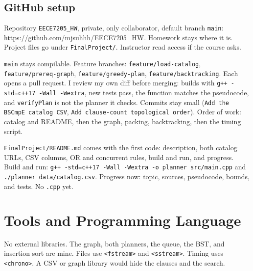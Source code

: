 \documentclass[10pt]{article}
\begin{document}
\subsection{GitHub setup}

Repository \texttt{EECE7205\_HW}, private, only collaborator, default branch
\texttt{main}: \url{https://github.com/mjsuhhh/EECE7205_HW}.
Homework stays where it is. Project files go under \texttt{FinalProject/}.
Instructor read access if the course asks.

\texttt{main} stays compilable. Feature branches:
\texttt{feature/load-catalog}, \texttt{feature/prereq-graph},
\texttt{feature/greedy-plan}, \texttt{feature/backtracking}.
Each opens a pull request. I review my own diff before merging: builds with
\texttt{g++ -std=c++17 -Wall -Wextra}, new tests pass, the function matches the
pseudocode, and \texttt{verifyPlan} is not the planner it checks.
Commits stay small (\texttt{Add the BSCmpE catalog CSV},
\texttt{Add clause-count topological order}).
Order of work: catalog and README, then the graph, packing, backtracking, then
the timing script.

\texttt{FinalProject/README.md} comes with the first code: description, both
catalog URLs, CSV columns, OR and concurrent rules, build and run, and progress.
Build and run: \texttt{g++ -std=c++17 -Wall -Wextra -o planner src/main.cpp}
and \texttt{./planner data/catalog.csv}.
Progress now: topic, sources, pseudocode, bounds, and tests. No \texttt{.cpp}
yet.

\section{Tools and Programming Language}

No external libraries. The graph, both planners, the queue, the BST, and
insertion sort are mine. Files use \texttt{<fstream>} and \texttt{<sstream>}.
Timing uses \texttt{<chrono>}. A CSV or graph library would hide the clauses
and the search.
\end{document}
